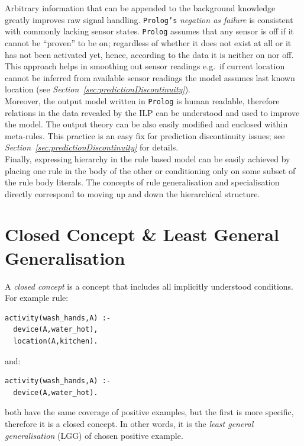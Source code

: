 \documentclass[10pt, a4paper, pdflatex, leqno, twoside, openright]{report}
\begin{document}
Arbitrary information that can be appended to the background knowledge greatly improves raw signal handling. \texttt{Prolog's} \emph{negation as failure} is consistent with commonly lacking sensor states. \texttt{Prolog} assumes that any sensor is off if it cannot be ``proven'' to be on; regardless of whether it does not exist at all or it has not been activated yet, hence, according to the data it is neither on nor off. This approach helps in smoothing out sensor readings e.g.\ if current location cannot be inferred from available sensor readings the model assumes last known location (see \emph{Section~\ref{sec:predictionDiscontinuity}}).\\

Moreover, the output model written in \texttt{Prolog} is human readable, therefore relations in the data revealed by the ILP can be understood and used to improve the model. The output theory can be also easily modified and enclosed within meta-rules. This practice is an easy fix for prediction discontinuity issues; see \emph{Section~\ref{sec:predictionDiscontinuity}} for details.\\

Finally, expressing hierarchy in the rule based model can be easily achieved by placing one rule in the body of the other or conditioning only on some subset of the rule body literals. The concepts of rule generalisation and specialisation directly correspond to moving up and down the hierarchical structure.

  \section{Closed Concept \& Least General Generalisation\label{sec:closedConcept}}
A \emph{closed concept} is a concept that includes all implicitly understood conditions. For example rule:\\
\begin{verbatim}
activity(wash_hands,A) :-
  device(A,water_hot),
  location(A,kitchen).
\end{verbatim}
and:\\
\begin{verbatim}
activity(wash_hands,A) :-
  device(A,water_hot).
\end{verbatim}
both have the same coverage of positive examples, but the first is more specific, therefore it is a closed concept. In other words, it is the \emph{least general generalisation} (LGG) of chosen positive example.\\
\end{document}
